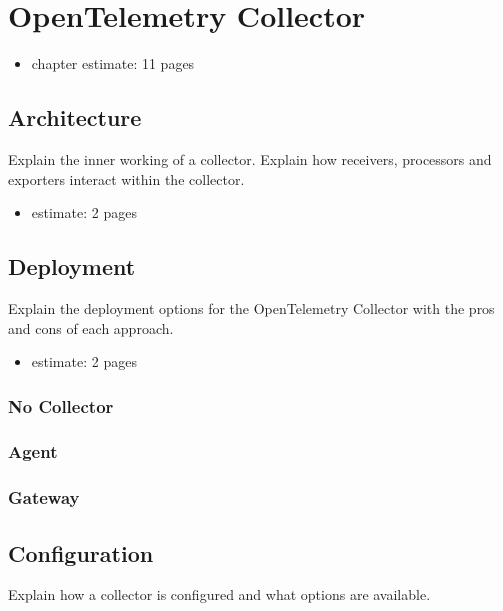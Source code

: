 \chapter{OpenTelemetry Collector}
\label{chap:collector}

\begin{itemize}
    \item chapter estimate: 11 pages
\end{itemize}

\section{Architecture}
\label{sec:c_architecture}

Explain the inner working of a collector.
Explain how receivers, processors and exporters interact within the collector.

\begin{itemize}
    \item estimate: 2 pages
\end{itemize}

\section{Deployment}
\label{sec:c_deployment}

Explain the deployment options for the OpenTelemetry Collector with the pros and cons of each approach.

\begin{itemize}
    \item estimate: 2 pages
\end{itemize}

\subsection{No Collector}
\subsection{Agent}
\subsection{Gateway}

\section{Configuration}
\label{sec:c_configuration}

Explain how a collector is configured and what options are available.

